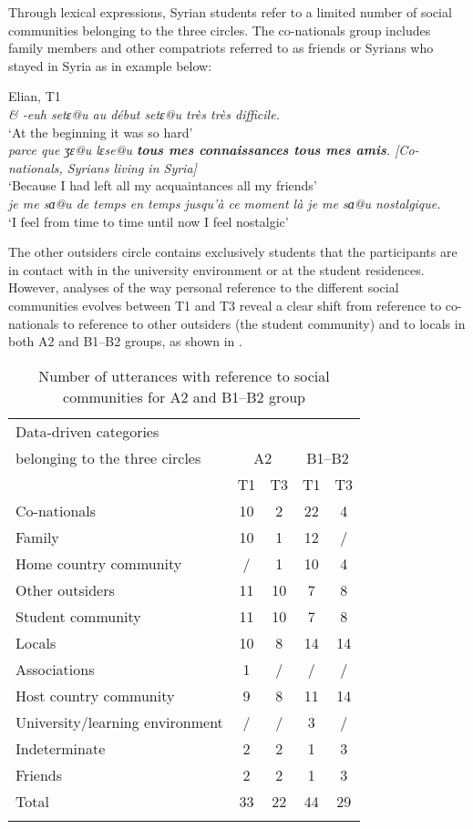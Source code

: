 \documentclass[output=paper]{langscibook}
\begin{document}
Through lexical expressions, Syrian students refer to a limited number of social communities belonging to the three circles. The co-nationals group includes family members and other compatriots referred to as friends or Syrians who stayed in Syria as in example  below:

\newpage
\ea%
\label{ex:7}Elian, T1\medskip\\
\textit{\& -euh setɛ@u au début setɛ@u très très difficile.}\\
\glt `At the beginning it was so hard'\\
\textit{parce que ʒɛ@u lɛse@u \textbf{tous mes connaissances tous mes amis}. [Co-nationals, Syrians living in Syria]}\\
\glt `Because I had left all my acquaintances all my friends'\\
\textit{je me sɑ@u de temps en temps jusqu'à ce moment là je me sɑ@u nostalgique.}\\
\glt `I feel from time to time until now I feel nostalgic'
\z

The other outsiders circle contains exclusively students that the participants are in contact with in the university environment or at the student residences. However, analyses of the way personal reference to the different social communities evolves between T1 and T3 reveal a clear shift from reference to co-nationals to reference to other outsiders (the student community) and to locals in both A2 and B1–B2 groups, as shown in .


\begin{table}
\begin{tabular}{lcccc}
\lsptoprule
{Data-driven categories} & \\
{belonging to the three circles} & \multicolumn{2}{c}{{A2}} & \multicolumn{2}{c}{{B1--B2}}\\
\cmidrule(lr){2-3}\cmidrule(lr){4-5}
& {T1} & {T3} & {T1} & {T3}\\
\midrule
Co-nationals & 10 & 2 & 22 & 4\\
Family & 10 & 1 & 12 & /\\
Home country community & / & 1 & 10 & 4\\
\midrule
Other outsiders & 11 & 10 & 7 & 8\\
Student community & 11 & 10 & 7 & 8\\
\midrule
Locals & 10 & 8 & 14 & 14\\
Associations & 1 & / & / & /\\
Host country community & 9 & 8 & 11 & 14\\
University/learning environment & / & / & 3 & /\\
\midrule
Indeterminate & 2 & 2 & 1 & 3\\
Friends & 2 & 2 & 1 & 3\\
\midrule
{Total}  & {33} & {22} & {44} & {29}\\
\lspbottomrule
\end{tabular}
\caption{Number of utterances with reference to social communities for A2 and B1–B2 group}
\label{tab:saddour:5}
\end{table}
\end{document}
